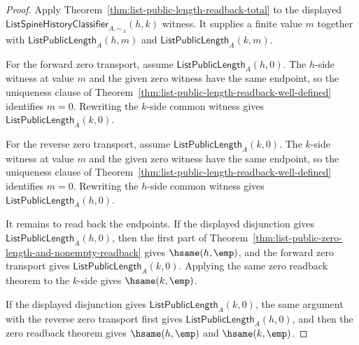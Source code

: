 \begin{proof}
Apply Theorem~\ref{thm:list-public-length-readback-total} to the displayed
$\mathsf{ListSpineHistoryClassifier}_{A,\sim_A}(h,k)$ witness. It supplies a
finite value $m$ together with $\mathsf{ListPublicLength}_A(h,m)$ and
$\mathsf{ListPublicLength}_A(k,m)$.

For the forward zero transport, assume
$\mathsf{ListPublicLength}_A(h,0)$. The $h$-side witness at value $m$ and the
given zero witness have the same endpoint, so the uniqueness clause of
Theorem~\ref{thm:list-public-length-readback-well-defined} identifies $m=0$.
Rewriting the $k$-side common witness gives
$\mathsf{ListPublicLength}_A(k,0)$.

For the reverse zero transport, assume
$\mathsf{ListPublicLength}_A(k,0)$. The $k$-side witness at value $m$ and the
given zero witness have the same endpoint, so the uniqueness clause of
Theorem~\ref{thm:list-public-length-readback-well-defined} identifies $m=0$.
Rewriting the $h$-side common witness gives
$\mathsf{ListPublicLength}_A(h,0)$.

It remains to read back the endpoints. If the displayed disjunction gives
$\mathsf{ListPublicLength}_A(h,0)$, then the first part of
Theorem~\ref{thm:list-public-zero-length-and-nonempty-readback} gives
$\hsame(h,\emp)$, and the forward zero transport gives
$\mathsf{ListPublicLength}_A(k,0)$. Applying the same zero readback theorem to
the $k$-side gives $\hsame(k,\emp)$.

If the displayed disjunction gives $\mathsf{ListPublicLength}_A(k,0)$, the same
argument with the reverse zero transport first gives
$\mathsf{ListPublicLength}_A(h,0)$, and then the zero readback theorem gives
$\hsame(h,\emp)$ and $\hsame(k,\emp)$.
\end{proof}

